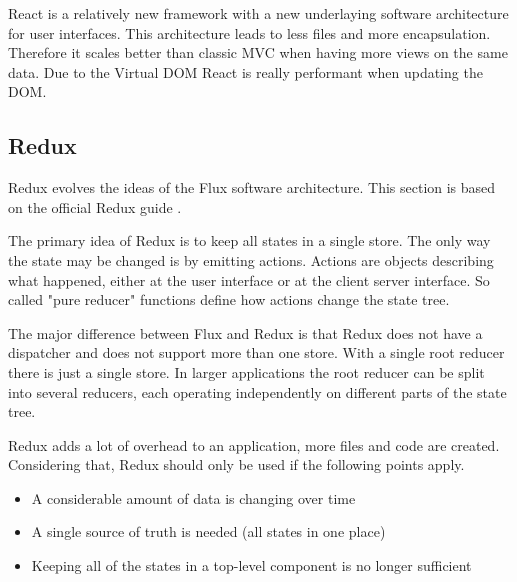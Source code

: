 React is a relatively new framework with a new underlaying software architecture for user interfaces. This architecture leads to less files and more encapsulation. Therefore it scales better than classic MVC when having more views on the same data. Due to the Virtual DOM React is really performant when updating the DOM.

\subsection{Redux}

Redux evolves the ideas of the Flux software architecture.
This section is based on the official Redux guide \cite{Redux}.

The primary idea of Redux is to keep all states in a single store.
The only way the state may be changed is by emitting actions.
Actions are objects describing what happened, either at the user interface or at 
the client server interface. So called "pure reducer" functions
define how actions change the state tree.

The major difference between Flux and Redux is that Redux does not have 
a dispatcher and does not support more than one store. With a single root reducer there is just a single store.
In larger applications the root reducer can be split into several reducers,
each operating independently on different parts of the state tree.
 
Redux adds a lot of overhead to an application, more files and code are created. 
Considering that, Redux should only be used if the following points apply.

\begin{itemize}
\item A considerable amount of data is changing over time
\item A single source of truth is needed (all states in one place)
\item Keeping all of the states in a top-level component is no longer sufficient
\end{itemize}

